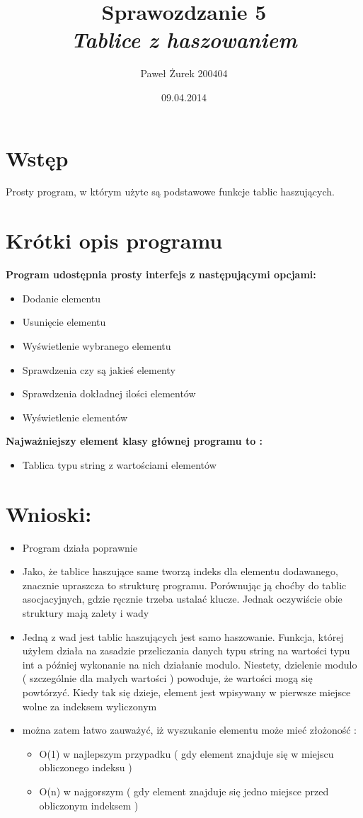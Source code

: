 \documentclass[10 pt]{article}
\title{Sprawozdzanie 5 \\ \emph{\textbf{Tablice z haszowaniem}}}
\author{Paweł Żurek 200404}
\date{09.04.2014}
\begin{document}
\tableofcontents
\maketitle
\section{Wstęp}
Prosty program, w którym użyte są podstawowe funkcje tablic haszujących.
\section{Krótki opis programu}
\textbf{Program udostępnia prosty interfejs z następującymi opcjami: }
\begin{itemize}
\item Dodanie elementu
\item Usunięcie elementu
\item Wyświetlenie wybranego elementu
\item Sprawdzenia czy są jakieś elementy
\item Sprawdzenia dokładnej ilości elementów
\item Wyświetlenie elementów
\end{itemize}

\textbf{Najważniejszy element klasy głównej programu to : }
\begin{itemize}
\item Tablica typu string z wartościami elementów
\end{itemize}

\section{Wnioski:}
\begin{itemize}
\item Program działa poprawnie
\item Jako, że tablice haszujące same tworzą indeks dla elementu dodawanego, znacznie upraszcza to strukturę programu. Porównując ją choćby do tablic asocjacyjnych, gdzie ręcznie trzeba ustalać klucze. Jednak oczywiście obie struktury mają zalety i wady
\item Jedną z wad jest tablic haszujących jest samo haszowanie. Funkcja, której użyłem działa na zasadzie przeliczania danych typu string na wartości typu int a później wykonanie na nich działanie modulo. Niestety, dzielenie modulo ( szczególnie dla małych wartości ) powoduje, że wartości mogą się powtórzyć. Kiedy tak się dzieje, element jest wpisywany w pierwsze miejsce wolne za indeksem wyliczonym
\item można zatem łatwo zauważyć, iż wyszukanie elementu może mieć złożoność :
\begin{itemize}
\item O(1) w najlepszym przypadku ( gdy element znajduje się w miejscu obliczonego indeksu )
\item O(n) w najgorszym ( gdy element znajduje się jedno miejsce przed obliczonym indeksem )
\end{itemize}

\end{itemize}
\end{document}
